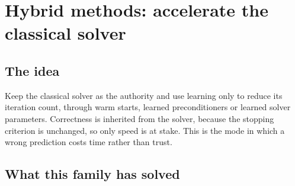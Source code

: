\documentclass[11pt, a4paper]{article}
\begin{document}
\section{Hybrid methods: accelerate the classical solver}
\label{sec:hybrid}

\subsection{The idea}

Keep the classical solver as the authority and use learning only to reduce
its iteration count, through warm starts, learned preconditioners or learned
solver parameters. Correctness is inherited from the solver, because the
stopping criterion is unchanged, so only speed is at stake. This is the mode
in which a wrong prediction costs time rather than trust.

\subsection{What this family has solved}
\end{document}
